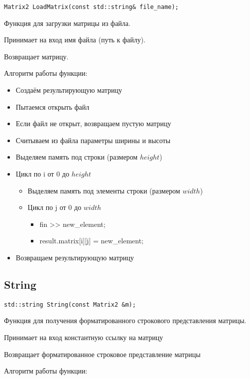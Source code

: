 \begin{lstlisting}[label={lst:LoadMatrix}]
	Matrix2 LoadMatrix(const std::string& file_name);
\end{lstlisting}

Функция для загрузки матрицы из файла.

Принимает на вход имя файла (путь к файлу).

Возвращает матрицу.

Алгоритм работы функции:

\begin{itemize}
	\item Создаём результирующую матрицу
	\item Пытаемся открыть файл
	\item Если файл не открыт, возвращаем пустую матрицу
	\item Считываем из файла параметры ширины и высоты
	\item Выделяем память под строки (размером $ height $)
	\item Цикл по i от 0 до $ height $
	\begin{itemize}
		\item Выделяем память под элементы строки (размером $ width $)
		\item Цикл по j от 0 до $ width $
		\begin{itemize}
			\item fin >> new\_element;
			\item result.matrix[i][j] = new\_element;
		\end{itemize}
	\end{itemize}
	\item Возвращаем результирующую матрицу
\end{itemize}

\subsection*{String}

\begin{lstlisting}[label={lst:String}]
	std::string String(const Matrix2 &m);
\end{lstlisting}

Функция для получения форматированного строкового представления матрицы.

Принимает на вход константную ссылку на матрицу

Возвращает форматированное строковое представление матрицы

Алгоритм работы функции:

